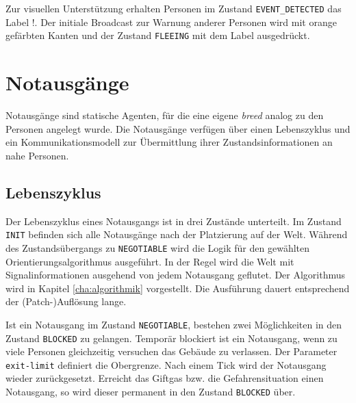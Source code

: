 Zur visuellen Unterstützung erhalten Personen im Zustand \verb|EVENT_DETECTED| das Label \glqq !{\grqq}. Der initiale Broadcast zur Warnung anderer Personen wird mit orange gefärbten Kanten und der Zustand \verb|FLEEING| mit dem Label \glqq *{\grqq} ausgedrückt.




\section{Notausgänge}
\label{sec:notausgaenge}

Notausgänge sind statische Agenten, für die eine eigene \emph{breed} analog zu den Personen angelegt wurde. Die Notausgänge verfügen über einen Lebenszyklus und ein Kommunikationsmodell zur Übermittlung ihrer Zustandsinformationen an nahe Personen. 

\subsection{Lebenszyklus}


Der Lebenszyklus eines Notausgangs ist in drei Zustände unterteilt. Im Zustand \verb|INIT| befinden sich alle Notausgänge nach der Platzierung auf der Welt. Während des Zustandsübergangs zu \verb|NEGOTIABLE| wird die Logik für den gewählten Orientierungsalgorithmus ausgeführt. In der Regel wird die Welt mit Signalinformationen ausgehend von jedem Notausgang geflutet. Der Algorithmus wird in Kapitel \ref{cha:algorithmik} vorgestellt. Die Ausführung dauert entsprechend der (Patch-)Auflösung lange.

Ist ein Notausgang im Zustand \verb|NEGOTIABLE|, bestehen zwei Möglichkeiten in den Zustand \verb|BLOCKED| zu gelangen. Temporär blockiert ist ein Notausgang, wenn zu viele Personen gleichzeitig versuchen das Gebäude zu verlassen. Der Parameter \verb|exit-limit| definiert die Obergrenze. Nach einem Tick wird der Notausgang wieder zurückgesetzt. Erreicht das Giftgas bzw. die Gefahrensituation einen Notausgang, so wird dieser permanent in den Zustand \verb|BLOCKED| über.

